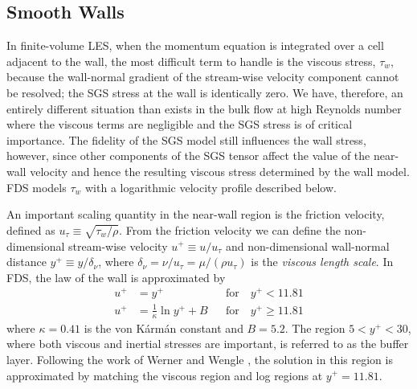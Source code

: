\subsection{Smooth Walls}
\label{smooth_wall_model}

In finite-volume LES, when the momentum equation is integrated over a cell adjacent to the wall, the most difficult term to handle is the viscous stress, $\tau_w$, because the wall-normal gradient of the stream-wise velocity component cannot be resolved; the SGS stress at the wall is identically zero.  We have, therefore, an entirely different situation than exists in the bulk flow at high Reynolds number where the viscous terms are negligible and the SGS stress is of critical importance.  The fidelity of the SGS model still influences the wall stress, however, since other components of the SGS tensor affect the value of the near-wall velocity and hence the resulting viscous stress determined by the wall model. FDS models $\tau_w$ with a logarithmic velocity profile \cite{Pope:2000} described below.

An important scaling quantity in the near-wall region is the friction velocity, defined as $u_\tau \equiv \sqrt{\tau_w/\rho}$.
From the friction velocity we can define the non-dimensional stream-wise velocity $u^+ \equiv u/u_\tau$ and non-dimensional wall-normal distance $y^+ \equiv y/\delta_\nu$, where $\delta_\nu = \nu/u_\tau = \mu/(\rho u_\tau)$ is the \emph{viscous length scale}. In FDS, the law of the wall is approximated by
\begin{align}
\label{eqn_visclayer} u^+ &= y^+                           && \mbox{for} \quad y^+ < 11.81 \\
\label{eqn_loglaw}    u^+ &= \frac{1}{\kappa} \ln y^+ + B  && \mbox{for} \quad y^+ \ge 11.81
\end{align}
where $\kappa = 0.41$ is the von K\'arm\'an constant and $B=5.2$.  The region $5 < y^+ < 30$, where both viscous and inertial stresses are important, is referred to as the buffer layer.  Following the work of Werner and Wengle \cite{Werner:1991}, the solution in this region is approximated by matching the viscous region and log regions at $y^+ = 11.81$.


